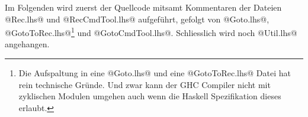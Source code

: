 \documentclass[
    a4paper,
    oneside,
    parskip=half,
    toc=listof,
    bibliography=totoc,
    listof=totoc,
]{scrbook}
\begin{document}
Im Folgenden wird zuerst der Quellcode mitsamt Kommentaren der Dateien
@Rec.lhs@ und @RecCmdTool.lhs@ aufgeführt, gefolgt von @Goto.lhs@,
@GotoToRec.lhs@\footnote{Die Aufspaltung in eine @Goto.lhs@ und eine
@GotoToRec.lhs@ Datei hat rein technische Gründe. Und zwar kann der GHC
Compiler nicht mit zyklischen Modulen umgehen auch wenn die Haskell
Spezifikation dieses erlaubt.} und @GotoCmdTool.lhs@. Schliesslich wird noch
@Util.lhs@ angehangen.






\end{document}
